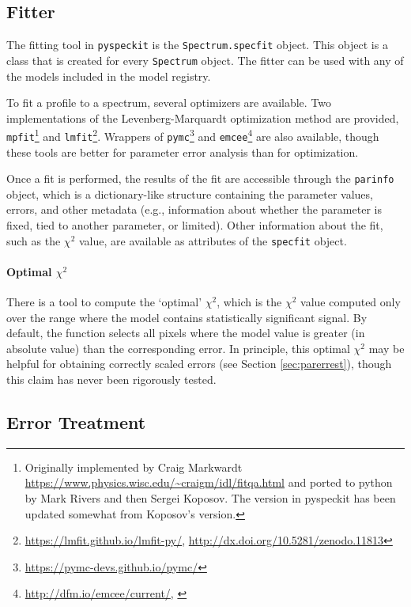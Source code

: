 \documentclass[twocolumn]{aastex61}
\newcommand{\pyspeckit}{\texttt{pyspeckit}\xspace}
\begin{document}
\subsection{Fitter}
\label{sec:fitters}
The fitting tool in \pyspeckit is the \texttt{Spectrum.specfit} object.
This object is a class that is created for every \texttt{Spectrum} object.
The fitter can be used with any of the models included in the model
registry.

To fit a profile to a spectrum, several optimizers are available.  Two
implementations of the Levenberg-Marquardt optimization method
\citep{Levenberg1944a,Marquardt1963a} are provided,
\texttt{mpfit}\footnote{Originally implemented by Craig Markwardt
\url{https://www.physics.wisc.edu/~craigm/idl/fitqa.html} and ported to python
by Mark Rivers and then Sergei Koposov.  The version in pyspeckit has been
updated somewhat from Koposov's version.} and
\texttt{lmfit}\footnote{\url{https://lmfit.github.io/lmfit-py/},
\url{http://dx.doi.org/10.5281/zenodo.11813}}.  Wrappers of
\texttt{pymc}\footnote{\url{https://pymc-devs.github.io/pymc/}} and
\texttt{emcee}\footnote{\url{http://dfm.io/emcee/current/},
\citet{Foreman-Mackey2013a}} are also available, though these tools are better
for parameter error analysis than for optimization.

Once a fit is performed, the results of the fit are accessible through the
\texttt{parinfo} object, which is a dictionary-like structure containing
the parameter values, errors, and other metadata (e.g., information about
whether the parameter is fixed, tied to another parameter, or limited).
Other information about the fit, such as the $\chi^2$ value, are available
as attributes of the \texttt{specfit} object.

\paragraph{Optimal $\chi^2$}
There is a tool to compute the `optimal' $\chi^2$, which is the $\chi^2$
value computed only over the range where the model contains statistically
significant signal.  By default, the function selects all pixels where
the model value is greater (in absolute value) than the corresponding error.
In principle, this optimal $\chi^2$ may be helpful for obtaining correctly
scaled errors (see Section \ref{sec:parerrest}), though this claim has never
been rigorously tested.


\subsection{Error Treatment}
\end{document}
